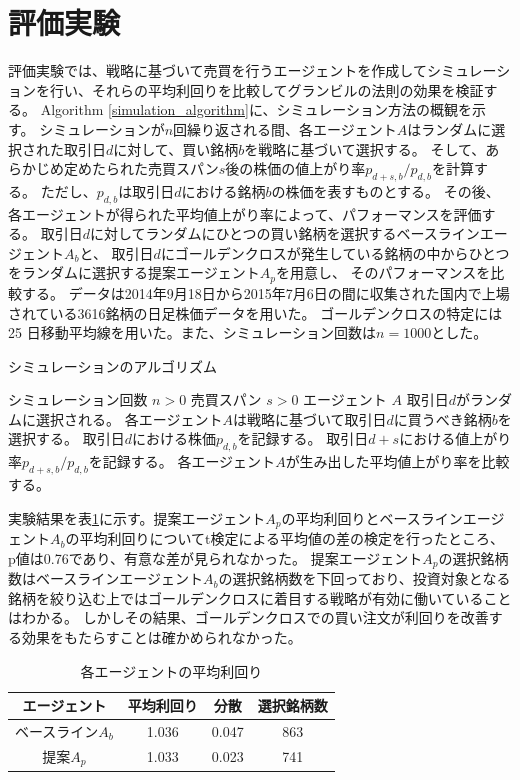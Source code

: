 \documentclass[twocolumn,jsaiac]{jarticle}
\begin{document}
\section{評価実験}
評価実験では、戦略に基づいて売買を行うエージェントを作成してシミュレーションを行い、それらの平均利回りを比較してグランビルの法則の効果を検証する。
Algorithm \ref{simulation_algorithm}に、シミュレーション方法の概観を示す。
シミュレーションが$n$回繰り返される間、各エージェント$A$はランダムに選択された取引日$d$に対して、買い銘柄$b$を戦略に基づいて選択する。
そして、あらかじめ定めたられた売買スパン$s$後の株価の値上がり率$p_{d+s,b}/p_{d,b}$を計算する。
ただし、$p_{d,b}$は取引日$d$における銘柄$b$の株価を表すものとする。
その後、各エージェントが得られた平均値上がり率によって、パフォーマンスを評価する。
取引日$d$に対してランダムにひとつの買い銘柄を選択するベースラインエージェント$A_b$と、
取引日$d$にゴールデンクロスが発生している銘柄の中からひとつをランダムに選択する提案エージェント$A_p$を用意し、
そのパフォーマンスを比較する。
データは2014年9月18日から2015年7月6日の間に収集された国内で上場されている3616銘柄の日足株価データを用いた。
ゴールデンクロスの特定には 25 日移動平均線を用いた。また、シミュレーション回数は$n=1000$とした。
\begin{algorithm}
\caption{シミュレーションのアルゴリズム}
\label{simulation_algorithm}
\begin{algorithmic}
\REQUIRE シミュレーション回数 $n > 0$
\REQUIRE 売買スパン $s > 0$
\REQUIRE エージェント $A$
\STATE 取引日$d$がランダムに選択される。
\STATE 各エージェント$A$は戦略に基づいて取引日$d$に買うべき銘柄$b$を選択する。
\STATE 取引日$d$における株価$p_{d,b}$を記録する。
\STATE 取引日$d+s$における値上がり率$p_{d+s,b}/p_{d,b}$を記録する。
\ENDFOR
\STATE 各エージェント$A$が生み出した平均値上がり率を比較する。
\end{algorithmic}
\end{algorithm}

実験結果を表\ref{result}に示す。提案エージェント$A_p$の平均利回りとベースラインエージェント$A_b$の平均利回りについてt検定による平均値の差の検定を行ったところ、
p値は0.76であり、有意な差が見られなかった。
提案エージェント$A_p$の選択銘柄数はベースラインエージェント$A_b$の選択銘柄数を下回っており、投資対象となる銘柄を絞り込む上ではゴールデンクロスに着目する戦略が有効に働いていることはわかる。
しかしその結果、ゴールデンクロスでの買い注文が利回りを改善する効果をもたらすことは確かめられなかった。
\begin{table}[htb]
\label{result}
\caption{各エージェントの平均利回り}
\begin{tabular}{c|c|c|c}
エージェント & 平均利回り & 分散 & 選択銘柄数 \\\hline\hline
ベースライン$A_b$ & 1.036 & 0.047 & 863 \\\hline
提案$A_p$ & 1.033 & 0.023 & 741\\\hline
\end{tabular}
\end{table}
\end{document}
